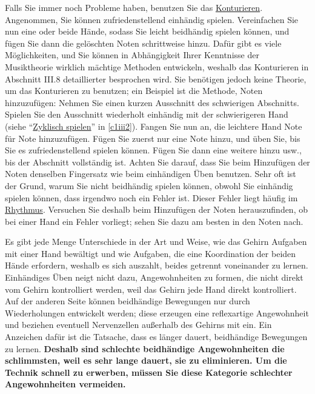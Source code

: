 Falls Sie immer noch Probleme haben, benutzen Sie das \hyperref[c1iii8]{Konturieren}.
Angenommen, Sie können zufriedenstellend einhändig spielen.
Vereinfachen Sie nun eine oder beide Hände, sodass Sie leicht beidhändig spielen können, und fügen Sie dann die gelöschten Noten schrittweise hinzu.
Dafür gibt es viele Möglichkeiten, und Sie können in Abhängigkeit Ihrer Kenntnisse der Musiktheorie wirklich mächtige Methoden entwickeln, weshalb das Konturieren in Abschnitt III.8 detaillierter besprochen wird.
Sie benötigen jedoch keine Theorie, um das Konturieren zu benutzen; ein Beispiel ist die Methode, Noten hinzuzufügen: Nehmen Sie einen kurzen Ausschnitt des schwierigen Abschnitts.
Spielen Sie den Ausschnitt wiederholt einhändig mit der schwierigeren Hand (siehe \enquote{\hyperref[c1iii2]{Zyklisch spielen}} in \ref*{c1iii2}).
Fangen Sie nun an, die leichtere Hand Note für Note hinzuzufügen.
Fügen Sie zuerst nur eine Note hinzu, und üben Sie, bis Sie es zufriedenstellend spielen können.
Fügen Sie dann eine weitere hinzu usw., bis der Abschnitt vollständig ist.
Achten Sie darauf, dass Sie beim Hinzufügen der Noten denselben Fingersatz wie beim einhändigen Üben benutzen.
Sehr oft ist der Grund, warum Sie nicht beidhändig spielen können, obwohl Sie einhändig spielen können, dass irgendwo noch ein Fehler ist.
Dieser Fehler liegt häufig im \hyperref[c1iii1b]{Rhythmus}.
Versuchen Sie deshalb beim Hinzufügen der Noten herauszufinden, ob bei einer Hand ein Fehler vorliegt;
sehen Sie dazu am besten in den Noten nach.

Es gibt jede Menge Unterschiede in der Art und Weise, wie das Gehirn Aufgaben mit einer Hand bewältigt und wie Aufgaben, die eine Koordination der beiden Hände erfordern, weshalb es sich auszahlt, beides getrennt voneinander zu lernen.
Einhändiges Üben neigt nicht dazu, Angewohnheiten zu formen, die nicht direkt vom Gehirn kontrolliert werden, weil das Gehirn jede Hand direkt kontrolliert.
Auf der anderen Seite können beidhändige Bewegungen nur durch Wiederholungen entwickelt werden; diese erzeugen eine reflexartige Angewohnheit und beziehen eventuell Nervenzellen außerhalb des Gehirns mit ein.
Ein Anzeichen dafür ist die Tatsache, dass es länger dauert, beidhändige Bewegungen zu lernen.
\textbf{Deshalb sind schlechte beidhändige Angewohnheiten die schlimmsten, weil es sehr lange dauert, sie zu eliminieren.
Um die Technik schnell zu erwerben, müssen Sie diese Kategorie schlechter Angewohnheiten vermeiden.}

